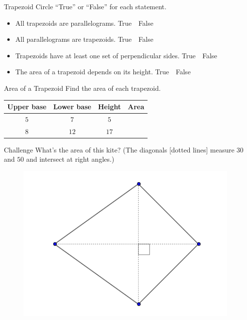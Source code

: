 \documentclass[14pt,letterpaper]{article}
\begin{document}
\begin{problem}{Trapezoid}
 Circle ``True'' or ``False'' for each statement.
 \begin{itemize}
  \item All trapezoids are parallelograms. \hfill True~~False
  \item All parallelograms are trapezoids. \hfill True~~False
  \item Trapezoids have at least one set of perpendicular sides.
  \hfill True~~False
  \item The area of a trapezoid depends on its height. \hfill True~~False
 \end{itemize}
\end{problem}

\begin{problem}{Area of a Trapezoid}
 Find the area of each trapezoid.

 \begin{center}
 \begin{tabular}{|c|c|c|c|}
  \hline
  Upper base & Lower base & Height & Area \\
  \hline
  $5$ & $7$ & $5$ & \\
  $8$ & $12$ & $17$ & \\
  \hline
 \end{tabular}
 \end{center}
\end{problem}

\begin{problem}{Challenge}
 What's the area of this kite? (The diagonals [dotted lines] measure $30$ and
 $50$ and intersect at right angles.)

 \begin{figure}
 \includegraphics[width=30em]{kite.png}
 \end{figure}
\end{problem}
\end{document}
